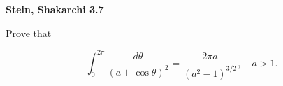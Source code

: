 \textbf{Stein, Shakarchi 3.7}

Prove that 

$$
\int_0^{2 \pi} {\frac{d \theta}{(a + \cos{\theta})^2}} = \frac{2 \pi a}{(a^2 - 1)^{3/2}}, \quad a > 1.
$$

\begin{solution}
  \ \\
\end{solution}